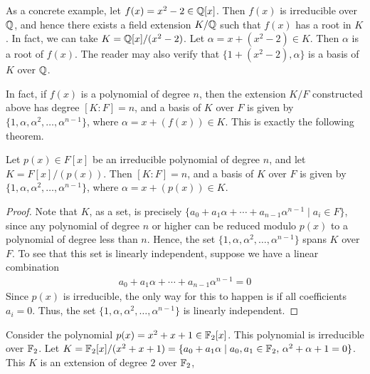 \begin{example}
    As a concrete example, let $f(x) = x^{2}-2 \in \mathbb{Q}[x]$. Then $f(x)$ is irreducible over $\mathbb{Q}$, and hence there exists a field extension $K/\mathbb{Q}$ such that $f(x)$ has a root in $K$. In fact, we can take $K = \mathbb{Q}[x]/(x^{2}-2)$. Let $\alpha = x+(x^{2}-2) \in K$. Then $\alpha$ is a root of $f(x)$. The reader may also verify that $\{1+(x^{2}-2),\alpha\}$ is a basis of $K$ over $\mathbb{Q}$.
\end{example}
In fact, if $f(x)$ is a polynomial of degree $n$, then the extension $K/F$ constructed above has degree $[K:F] = n$, and a basis of $K$ over $F$ is given by $\{1,\alpha,\alpha^{2},\ldots,\alpha^{n-1}\}$, where $\alpha = x+(f(x)) \in K$. This is exactly the following theorem.

\begin{theorem}
    Let $p(x) \in F[x]$ be an irreducible polynomial of degree $n$, and let $K = F[x]/(p(x))$. Then $[K:F] = n$, and a basis of $K$ over $F$ is given by $\{1,\alpha,\alpha^{2},\ldots,\alpha^{n-1}\}$, where $\alpha = x+(p(x)) \in K$.
\end{theorem}
\begin{proof}
    Note that $K$, as a set, is precisely $\{a_{0}+a_{1}\alpha+\cdots+a_{n-1}\alpha^{n-1} \mid a_{i} \in F\}$, since any polynomial of degree $n$ or higher can be reduced modulo $p(x)$ to a polynomial of degree less than $n$. Hence, the set $\{1,\alpha,\alpha^{2},\ldots,\alpha^{n-1}\}$ spans $K$ over $F$. To see that this set is linearly independent, suppose we have a linear combination
    \begin{align}
        a_{0}+a_{1}\alpha+\cdots+a_{n-1}\alpha^{n-1} = 0
    \end{align}
    Since $p(x)$ is irreducible, the only way for this to happen is if all coefficients $a_{i} = 0$. Thus, the set $\{1,\alpha,\alpha^{2},\ldots,\alpha^{n-1}\}$ is linearly independent.
\end{proof}

\begin{example}
    Consider the polynomial $p(x) = x^{2}+x+1 \in \mathbb{F}_{2}[x]$. This polynomial is irreducible over $\mathbb{F}_{2}$. Let $K = \mathbb{F}_{2}[x]/(x^{2}+x+1) = \{a_{0}+a_{1}\alpha \mid a_{0},a_{1} \in \mathbb{F}_{2}, \, \alpha^{2}+\alpha+1 = 0\}$. This $K$ is an extension of degree $2$ over $\mathbb{F}_{2}$, 
\end{example}

